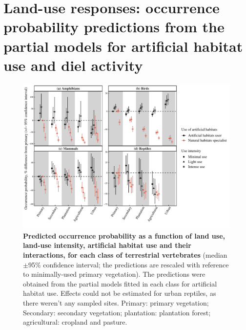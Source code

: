 \documentclass[11pt]{article}
\begin{document}
\clearpage
\section{Land-use responses: occurrence probability predictions from the partial models for artificial habitat use and diel activity}

\begin{figure}[h!]
\centering
\includegraphics[scale=0.7]{Figures/Partial_models_predictions/Specialisation}
\caption[Predicted occurrence probability as a function of land use, land-use intensity, artificial habitat use and their interactions in each class]{\textbf{Predicted occurrence probability as a function of land use, land-use intensity, artificial habitat use and their interactions, for each class of terrestrial vertebrates} (median $\pm$95\% confidence interval; the predictions are rescaled with reference to minimally-used primary vegetation). The predictions were obtained from the partial models fitted in each class for artificial habitat use. Effects could not be estimated for urban reptiles, as there weren't any sampled sites. Primary: primary vegetation; Secondary: secondary vegetation; plantation: plantation forest; agricultural: cropland and pasture.}
\label{SI_4_Figure10}
\end{figure}
\end{document}
